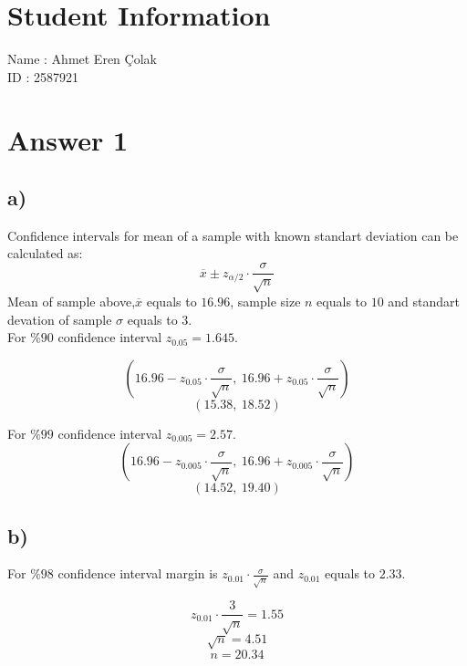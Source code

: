 \documentclass[12pt]{article}
\begin{document}
\section*{Student Information}

Name : Ahmet Eren Çolak\\

ID : 2587921\\

\section*{Answer 1}
\subsection*{a)}
Confidence intervals for mean of a sample with known standart deviation can be calculated as:
\begin{equation*}
	\overline{x} \pm z_{\alpha/2} \cdot \frac{\sigma}{\sqrt{n}}
\end{equation*}
Mean of sample above,$\overline{x}$ equals to $16.96$, sample size $n$ equals to $10$ and standart devation of sample $\sigma$ equals to $3$.\\
For $\%90$ confidence interval $z_{0.05} = 1.645$.

\begin{equation*}
	(16.96 - z_{0.05} \cdot \frac{\sigma}{\sqrt{n}}, \ 16.96 + z_{0.05} \cdot \frac{\sigma}{\sqrt{n}})
\end{equation*}
\begin{equation*}
	(15.38, \ 18.52)
\end{equation*}

For $\%99$ confidence interval $z_{0.005} = 2.57$.
\begin{equation*}
	(16.96 - z_{0.005} \cdot \frac{\sigma}{\sqrt{n}}, \ 16.96 + z_{0.005} \cdot \frac{\sigma}{\sqrt{n}})
\end{equation*}
\begin{equation*}
	(14.52, \ 19.40)
\end{equation*}

\subsection*{b)}
For $\%98$ confidence interval margin is $z_{0.01} \cdot \frac{\sigma}{\sqrt{n}}$ and $z_{0.01}$ equals to $2.33$.

\begin{equation*}
	z_{0.01} \cdot \frac{3}{\sqrt{n}} = 1.55
\end{equation*}
\begin{equation*}
	\sqrt{n} = 4.51
\end{equation*}
\begin{equation*}
	n = 20.34
\end{equation*}
\end{document}
